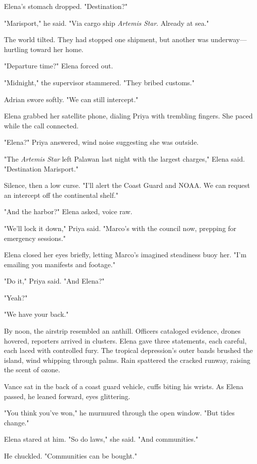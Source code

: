 Elena's stomach dropped. "Destination?"

"Marisport," he said. "Via cargo ship \textit{Artemis Star}. Already at sea."

The world tilted. They had stopped one shipment, but another was underway—hurtling toward her home.

"Departure time?" Elena forced out.

"Midnight," the supervisor stammered. "They bribed customs."

Adrian swore softly. "We can still intercept."

Elena grabbed her satellite phone, dialing Priya with trembling fingers. She paced while the call connected.

"Elena?" Priya answered, wind noise suggesting she was outside.

"The \textit{Artemis Star} left Palawan last night with the largest charges," Elena said. "Destination Marisport."

Silence, then a low curse. "I'll alert the Coast Guard and NOAA. We can request an intercept off the continental shelf."

"And the harbor?" Elena asked, voice raw.

"We'll lock it down," Priya said. "Marco's with the council now, prepping for emergency sessions."

Elena closed her eyes briefly, letting Marco's imagined steadiness buoy her. "I'm emailing you manifests and footage."

"Do it," Priya said. "And Elena?"

"Yeah?"

"We have your back."

\bigskip

By noon, the airstrip resembled an anthill. Officers cataloged evidence, drones hovered, reporters arrived in clusters. Elena gave three statements, each careful, each laced with controlled fury. The tropical depression's outer bands brushed the island, wind whipping through palms. Rain spattered the cracked runway, raising the scent of ozone.

Vance sat in the back of a coast guard vehicle, cuffs biting his wrists. As Elena passed, he leaned forward, eyes glittering.

"You think you've won," he murmured through the open window. "But tides change."

Elena stared at him. "So do laws," she said. "And communities."

He chuckled. "Communities can be bought."

